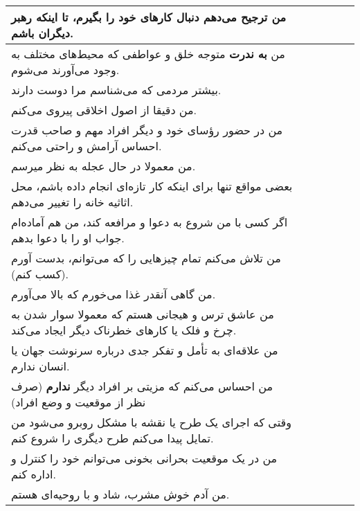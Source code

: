 \documentclass[a4paper,10pt]{article}
\begin{document}
\begin{center}
\begin{tabular}{|p{6cm}|c|c|c|c|c|}
من ترجیح می‌دهم دنبال کارهای خود را بگیرم، تا اینکه رهبر دیگران باشم.& & & & & \\
\hline


من \textbf{به ندرت} متوجه خلق و عواطفی که محیط‌های مختلف به وجود می‌آورند می‌شوم.& & & & & \\
\hline


بیشتر مردمی که می‌شناسم مرا دوست دارند.& & & & & \\
\hline


من دقیقا از اصول اخلاقی پیروی می‌کنم.& & & & & \\
\hline


من در حضور رؤسای خود و دیگر افراد مهم و صاحب قدرت احساس آرامش و راحتی می‌کنم.& & & & & \\
\hline


من معمولا در حال عجله به نظر میرسم.& & & & & \\
\hline


بعضی مواقع تنها برای اینکه کار تازه‌ای انجام داده باشم، محل اثاثیه خانه را تغییر می‌دهم.& & & & & \\
\hline


اگر کسی با من شروع به دعوا و مرافعه کند، من هم آماده‌ام جواب او را با دعوا بدهم.& & & & & \\
\hline


من تلاش می‌کنم تمام چیزهایی را که می‌توانم، بدست آورم (کسب کنم).& & & & & \\
\hline


من گاهی آنقدر غذا می‌خورم که بالا می‌آورم.& & & & & \\
\hline


من عاشق ترس و هیجانی هستم که معمولا سوار شدن به چرخ و فلک یا کارهای خطرناک دیگر ایجاد می‌کند.& & & & & \\
\hline


 من علاقه‌ای به تأمل و تفکر جدی درباره سرنوشت جهان یا انسان ندارم.& & & & & \\
\hline


من احساس می‌کنم که مزیتی بر افراد دیگر \textbf{ندارم} (صرف‌ نظر از موقعیت و وضع افراد)& & & & & \\
\hline


وقتی که اجرای یک طرح یا نقشه با مشکل روبرو می‌شود من تمایل پیدا می‌کنم طرح دیگری را شروع کنم.& & & & & \\
\hline


من در یک موقعیت بحرانی بخونی می‌توانم خود را کنترل و اداره کنم.& & & & & \\
\hline


من آدم خوش مشرب، شاد و با روحیه‌ای هستم.& & & & & \\
\hline



\end{tabular}
\end{center}
\end{document}
